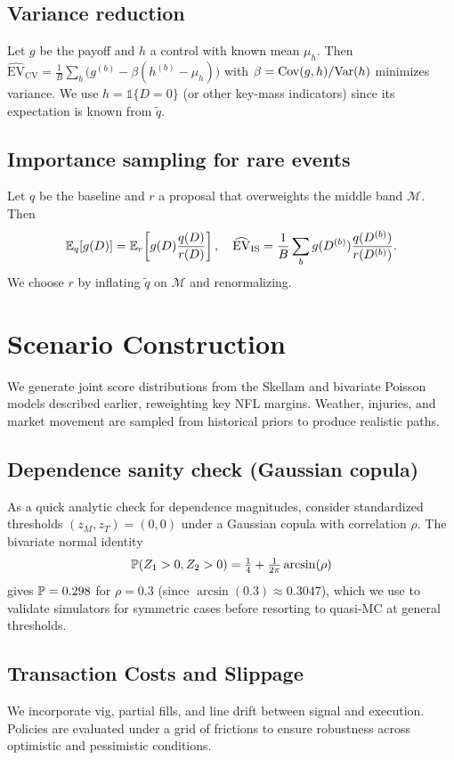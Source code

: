 \subsection{Variance reduction}\label{subsec:vr}
Let $g$ be the payoff and $h$ a control with known mean $\mu_h$. Then
$\widehat{\mathrm{EV}}_{\mathrm{CV}}=\frac1B\sum_b \big(g^{(b)}-\beta(h^{(b)}-\mu_h)\big)$
with $\beta=\mathrm{Cov}(g,h)/\mathrm{Var}(h)$ minimizes variance. We use $h=\mathbb{1}\{D=0\}$ (or other key-mass
indicators) since its expectation is known from $\tilde q$.

\subsection{Importance sampling for rare events}\label{subsec:is}
Let $q$ be the baseline and $r$ a proposal that overweights the middle band $\mathcal{M}$.
Then
\[
\mathbb{E}_q[g(D)] = \mathbb{E}_r\!\left[g(D)\frac{q(D)}{r(D)}\right],\quad
\widehat{\mathrm{EV}}_{\mathrm{IS}}=\frac1B\sum_b g(D^{(b)})\frac{q(D^{(b)})}{r(D^{(b)})}.
\]
We choose $r$ by inflating $\tilde q$ on $\mathcal{M}$ and renormalizing.

\section{Scenario Construction}
We generate joint score distributions from the Skellam and bivariate Poisson models described earlier, reweighting key NFL margins. Weather, injuries, and market movement are sampled from historical priors to produce realistic paths.

\subsection{Dependence sanity check (Gaussian copula)}
As a quick analytic check for dependence magnitudes, consider standardized thresholds $(z_M,z_T)=(0,0)$ under a Gaussian copula with correlation $\rho$. The bivariate normal identity
\[\mathbb{P}(Z_1>0, Z_2>0)=\tfrac{1}{4}+\tfrac{1}{2\pi}\arcsin(\rho)\]
gives $\mathbb{P}=0.298$ for $\rho=0.3$ (since $\arcsin(0.3)\approx 0.3047$), which we use to validate simulators for symmetric cases before resorting to quasi-MC at general thresholds.

\subsection{Transaction Costs and Slippage}
We incorporate vig, partial fills, and line drift between signal and execution. Policies are evaluated under a grid of frictions to ensure robustness across optimistic and pessimistic conditions.

